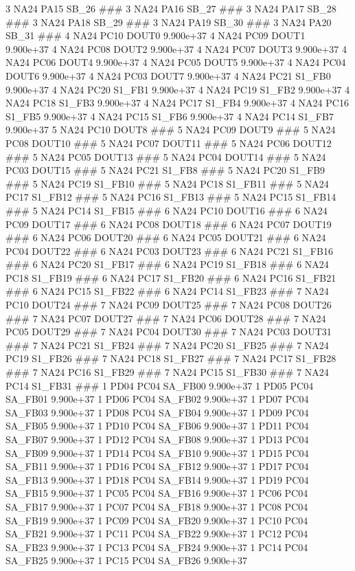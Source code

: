 3 NA24 PA15 SB_26 ### 
3 NA24 PA16 SB_27 ### 
3 NA24 PA17 SB_28 ### 
3 NA24 PA18 SB_29 ### 
3 NA24 PA19 SB_30 ### 
3 NA24 PA20 SB_31 ### 
4 NA24 PC10 DOUT0 9.900e+37 
4 NA24 PC09 DOUT1 9.900e+37 
4 NA24 PC08 DOUT2 9.900e+37 
4 NA24 PC07 DOUT3 9.900e+37 
4 NA24 PC06 DOUT4 9.900e+37 
4 NA24 PC05 DOUT5 9.900e+37 
4 NA24 PC04 DOUT6 9.900e+37 
4 NA24 PC03 DOUT7 9.900e+37 
4 NA24 PC21 S1_FB0 9.900e+37 
4 NA24 PC20 S1_FB1 9.900e+37 
4 NA24 PC19 S1_FB2 9.900e+37 
4 NA24 PC18 S1_FB3 9.900e+37 
4 NA24 PC17 S1_FB4 9.900e+37 
4 NA24 PC16 S1_FB5 9.900e+37 
4 NA24 PC15 S1_FB6 9.900e+37 
4 NA24 PC14 S1_FB7 9.900e+37 
5 NA24 PC10 DOUT8 ### 
5 NA24 PC09 DOUT9 ### 
5 NA24 PC08 DOUT10 ### 
5 NA24 PC07 DOUT11 ### 
5 NA24 PC06 DOUT12 ### 
5 NA24 PC05 DOUT13 ### 
5 NA24 PC04 DOUT14 ### 
5 NA24 PC03 DOUT15 ### 
5 NA24 PC21 S1_FB8 ### 
5 NA24 PC20 S1_FB9 ### 
5 NA24 PC19 S1_FB10 ### 
5 NA24 PC18 S1_FB11 ### 
5 NA24 PC17 S1_FB12 ### 
5 NA24 PC16 S1_FB13 ### 
5 NA24 PC15 S1_FB14 ### 
5 NA24 PC14 S1_FB15 ### 
6 NA24 PC10 DOUT16 ### 
6 NA24 PC09 DOUT17 ### 
6 NA24 PC08 DOUT18 ### 
6 NA24 PC07 DOUT19 ### 
6 NA24 PC06 DOUT20 ### 
6 NA24 PC05 DOUT21 ### 
6 NA24 PC04 DOUT22 ### 
6 NA24 PC03 DOUT23 ### 
6 NA24 PC21 S1_FB16 ### 
6 NA24 PC20 S1_FB17 ### 
6 NA24 PC19 S1_FB18 ### 
6 NA24 PC18 S1_FB19 ### 
6 NA24 PC17 S1_FB20 ### 
6 NA24 PC16 S1_FB21 ### 
6 NA24 PC15 S1_FB22 ### 
6 NA24 PC14 S1_FB23 ### 
7 NA24 PC10 DOUT24 ### 
7 NA24 PC09 DOUT25 ### 
7 NA24 PC08 DOUT26 ### 
7 NA24 PC07 DOUT27 ### 
7 NA24 PC06 DOUT28 ### 
7 NA24 PC05 DOUT29 ### 
7 NA24 PC04 DOUT30 ### 
7 NA24 PC03 DOUT31 ### 
7 NA24 PC21 S1_FB24 ### 
7 NA24 PC20 S1_FB25 ### 
7 NA24 PC19 S1_FB26 ### 
7 NA24 PC18 S1_FB27 ### 
7 NA24 PC17 S1_FB28 ### 
7 NA24 PC16 S1_FB29 ### 
7 NA24 PC15 S1_FB30 ### 
7 NA24 PC14 S1_FB31 ### 
1 PD04 PC04 SA_FB00 9.900e+37 
1 PD05 PC04 SA_FB01 9.900e+37 
1 PD06 PC04 SA_FB02 9.900e+37 
1 PD07 PC04 SA_FB03 9.900e+37 
1 PD08 PC04 SA_FB04 9.900e+37 
1 PD09 PC04 SA_FB05 9.900e+37 
1 PD10 PC04 SA_FB06 9.900e+37 
1 PD11 PC04 SA_FB07 9.900e+37 
1 PD12 PC04 SA_FB08 9.900e+37 
1 PD13 PC04 SA_FB09 9.900e+37 
1 PD14 PC04 SA_FB10 9.900e+37 
1 PD15 PC04 SA_FB11 9.900e+37 
1 PD16 PC04 SA_FB12 9.900e+37 
1 PD17 PC04 SA_FB13 9.900e+37 
1 PD18 PC04 SA_FB14 9.900e+37 
1 PD19 PC04 SA_FB15 9.900e+37 
1 PC05 PC04 SA_FB16 9.900e+37 
1 PC06 PC04 SA_FB17 9.900e+37 
1 PC07 PC04 SA_FB18 9.900e+37 
1 PC08 PC04 SA_FB19 9.900e+37 
1 PC09 PC04 SA_FB20 9.900e+37 
1 PC10 PC04 SA_FB21 9.900e+37 
1 PC11 PC04 SA_FB22 9.900e+37 
1 PC12 PC04 SA_FB23 9.900e+37 
1 PC13 PC04 SA_FB24 9.900e+37 
1 PC14 PC04 SA_FB25 9.900e+37 
1 PC15 PC04 SA_FB26 9.900e+37 
